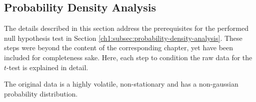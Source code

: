 \subsection{Probability Density Analysis}
\label{appx-a:ch1:probability-density-analysis}

The details described in this section address the prerequisites for the performed null hypothesis test in Section \ref{ch1:subsec:probability-density-analysis}.
These steps were beyond the content of the corresponding chapter, yet have been included for completeness sake.
Here, each step to condition the raw data for the $t$-test is explained in detail.

The original data is a highly volatile, non-stationary and has a non-gaussian probability distribution.
